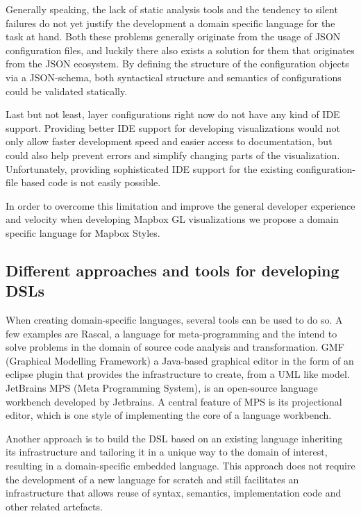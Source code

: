 \documentclass[conference]{IEEEtran}
\begin{document}
Generally speaking, the lack of static analysis tools and the tendency to silent failures do not yet justify the development a domain specific language for the task at hand. Both these problems generally originate from the usage of JSON configuration files, and luckily there also exists a solution for them that originates from the JSON ecosystem. By defining the structure of the configuration objects via a JSON-schema, both syntactical structure and semantics of configurations could be validated statically\cite{pezoa2016json}.

Last but not least, layer configurations right now do not have any kind of IDE support. Providing better IDE support for developing visualizations would not only allow faster development speed and easier access to documentation, but could also help prevent errors and simplify changing parts of the visualization. Unfortunately, providing sophisticated IDE support for the existing configuration-file based code is not easily possible. 

In order to overcome this limitation and improve the general developer experience and velocity when developing Mapbox GL visualizations we propose a domain specific language for Mapbox Styles.


\subsection{Different approaches and tools for developing DSLs}
When creating domain-specific languages, several tools can be used to do so. A few examples are Rascal, a  language for meta-programming and the intend to solve problems in the domain of source code analysis and transformation\cite{klint2009easy}.
GMF (Graphical Modelling Framework) a Java-based graphical editor in the form of an eclipse plugin that provides the infrastructure to create, from a UML like model\cite{james2011designing}.
JetBrains MPS (Meta Programming System), is an open-source language workbench developed by Jetbrains. A central feature of MPS is its projectional editor, which is one style of implementing the core of a language workbench\cite{voelter2019lessons}.

Another approach is to build the DSL based on an existing language inheriting its infrastructure and tailoring it in a unique way to the domain of interest, resulting in a domain-specific embedded language. This approach does not require the development of a new language for scratch and still facilitates an infrastructure that allows reuse of syntax, semantics, implementation code and other related artefacts\cite{685738}.
 
\end{document}
